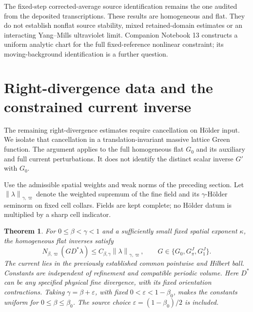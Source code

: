 \documentclass[11pt]{article}
\newtheorem{theorem}{Theorem}[section]
\theoremstyle{remark}
\newcommand{\norm}[1]{\left\|#1\right\|}
\begin{document}
The fixed-step corrected-average source identification remains the
one audited from the deposited transcriptions. These results are
homogeneous and flat. They do not establish nonflat source stability,
mixed retained-domain estimates or an interacting Yang--Mills
ultraviolet limit. Companion Notebook 13 constructs a uniform
analytic chart for the full fixed-reference nonlinear constraint;
its moving-background identification is a further question.

\section{Right-divergence data and the constrained current inverse}
\label{rd-section}

The remaining right-divergence estimates require cancellation on
H\"older input. We isolate that cancellation in a translation-invariant
massive lattice Green function. The argument applies to the full
homogeneous flat $G_0$ and its auxiliary and full current perturbations.
It does not identify the distinct scalar inverse $G'$ with $G_0$.

Use the admissible spatial weights and weak norms of the preceding
section. Let $\norm{\lambda}_{\gamma,\varpi}$ denote the weighted
supremum of the fine field and its $\gamma$-H\"older seminorm on
fixed cell collars. Fields are kept complete; no H\"older datum is
multiplied by a sharp cell indicator.

\begin{theorem}\label{rd-theorem}
For $0\le\beta<\gamma<1$ and a sufficiently small fixed spatial
exponent $\kappa$, the homogeneous flat inverses satisfy
\begin{equation}\label{rd-main-estimate}
 N_{\beta,\varpi}(G D^*\lambda)
       \le C_{\beta,\gamma}\norm{\lambda}_{\gamma,\varpi},
 \qquad G\in\{G_0,G_\pi^J,G_1^J\}.
\end{equation}
The current lies in the previously established common pointwise and
Hilbert ball. Constants are independent of refinement and compatible
periodic volume. Here $D^*$ can be any specified physical fine
divergence, with its fixed orientation contractions. Taking
$\gamma=\beta+\varepsilon$, with fixed
$0<\varepsilon<1-\beta_0$, makes the constants uniform for
$0\le\beta\le\beta_0$. The source choice
$\varepsilon=(1-\beta_0)/2$ is included.
\end{theorem}
\end{document}
